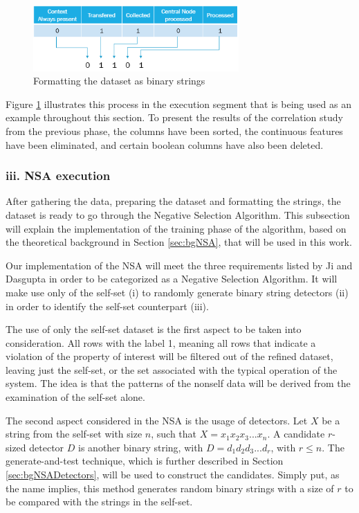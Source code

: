 \begin{figure}[!h]
	\centering
	\includegraphics[width=0.7\textwidth, keepaspectratio]{img/stringFormatting.png}
	\caption{Formatting the dataset as binary strings}
	\label{fig:stringFormatting}
\end{figure}

Figure \ref{fig:stringFormatting} illustrates this process in the execution segment that is being used as an example throughout this section. To present the results of the correlation study from the previous phase, the columns have been sorted, the continuous features have been eliminated, and certain boolean columns have also been deleted.

\subsubsection{iii. NSA execution}

After gathering the data, preparing the dataset and formatting the strings, the dataset is ready to go through the Negative Selection Algorithm. This subsection will explain the implementation of the training phase of the algorithm, based on the theoretical background in Section \ref{sec:bgNSA}, that will be used in this work.

Our implementation of the NSA will meet the three requirements listed by Ji and Dasgupta \cite{RevisitingNSA2007} in order to be categorized as a Negative Selection Algorithm. It will make use only of the self-set (i) to randomly generate binary string detectors (ii) in order to identify the self-set counterpart (iii).

The use of only the self-set dataset is the first aspect to be taken into consideration. All rows with the label 1, meaning all rows that indicate a violation of the property of interest will be filtered out of the refined dataset, leaving just the self-set, or the set associated with the typical operation of the system. The idea is that the patterns of the nonself data will be derived from the examination of the self-set alone.

The second aspect considered in the NSA is the usage of detectors. Let \(X\) be a string from the self-set with size \(n\), such that \(X = x_1x_2x_3...x_n\). A candidate \(r\)-sized detector \(D\) is another binary string, with \(D = d_1d_2d_3...d_r\), with \(r \leq n\). The generate-and-test technique, which is further described in Section \ref{sec:bgNSADetectors}, will be used to construct the candidates. Simply put, as the name implies, this method generates random binary strings with a size of \(r\) to be compared with the strings in the self-set. 

